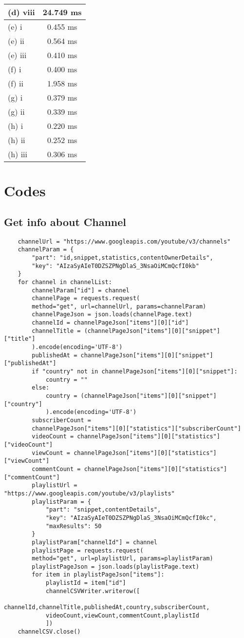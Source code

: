 \documentclass[10pt]{article}
\begin{document}
\begin{enumerate}
\begin{enumerate}
\begin{table}[]
\begin{tabular}{|l|c|}
					(d) viii & 24.749 ms \\ \hline
					(e) i & 0.455 ms \\ \hline
					(e) ii & 0.564 ms \\ \hline
					(e) iii & 0.410 ms \\ \hline
					(f) i & 0.400 ms \\ \hline
					(f) ii & 1.958 ms \\ \hline
					(g) i & 0.379 ms \\ \hline
					(g) ii & 0.339 ms \\ \hline
					(h) i & 0.220 ms \\ \hline
					(h) ii & 0.252 ms \\ \hline
					(h) iii & 0.306 ms \\ \hline
				\end{tabular}
			\end{table}
		\end{enumerate}
	\end{enumerate}
	
	\section{Codes}
	\subsection{Get info about Channel}
	\begin{lstlisting}
	channelUrl = "https://www.googleapis.com/youtube/v3/channels"
	channelParam = {
		"part": "id,snippet,statistics,contentOwnerDetails",
		"key": "AIzaSyAIeT0DZSZPNgDlaS_3NsaOiMCmQcfI0kb"
	}
	for channel in channelList:
		channelParam["id"] = channel
		channelPage = requests.request(
		method="get", url=channelUrl, params=channelParam)
		channelPageJson = json.loads(channelPage.text)
		channelId = channelPageJson["items"][0]["id"]
		channelTitle = (channelPageJson["items"][0]["snippet"]["title"]
		).encode(encoding='UTF-8')
		publishedAt = channelPageJson["items"][0]["snippet"]["publishedAt"]
		if "country" not in channelPageJson["items"][0]["snippet"]:
			country = ""
		else:
			country = (channelPageJson["items"][0]["snippet"]["country"]
			).encode(encoding='UTF-8')
		subscriberCount = 
		channelPageJson["items"][0]["statistics"]["subscriberCount"]
		videoCount = channelPageJson["items"][0]["statistics"]["videoCount"]
		viewCount = channelPageJson["items"][0]["statistics"]["viewCount"]
		commentCount = channelPageJson["items"][0]["statistics"]["commentCount"]
		playlistUrl = "https://www.googleapis.com/youtube/v3/playlists"
		playlistParam = {
			"part": "snippet,contentDetails",
			"key": "AIzaSyAIeT0DZSZPNgDlaS_3NsaOiMCmQcfI0kc",
			"maxResults": 50
		}
		playlistParam["channelId"] = channel
		playlistPage = requests.request(
		method="get", url=playlistUrl, params=playlistParam)
		playlistPageJson = json.loads(playlistPage.text)
		for item in playlistPageJson["items"]:
			playlistId = item["id"]
			channelCSVWriter.writerow([
			channelId,channelTitle,publishedAt,country,subscriberCount,
			videoCount,viewCount,commentCount,playlistId
			])
	channelCSV.close()
	\end{lstlisting}
\end{document}
